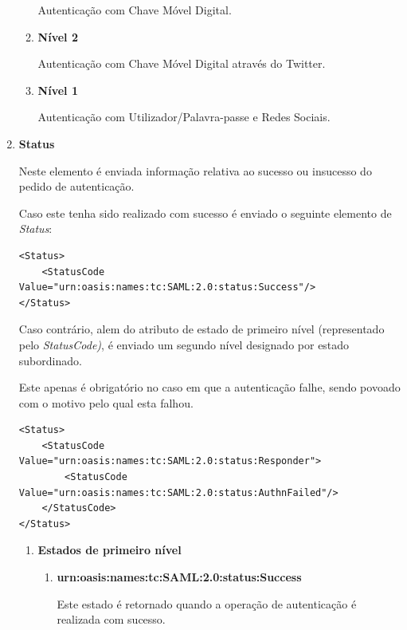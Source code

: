 \begin{enumerate}
\begin{enumerate}
        Autenticação com Chave Móvel Digital.
        
        \item \textbf{Nível 2}
        
        Autenticação com Chave Móvel Digital através do Twitter.
        
        \item \textbf{Nível 1}
        
        Autenticação com Utilizador/Palavra-passe  e Redes Sociais.
    \end{enumerate}
    
    \item \textbf{Status}
    
    Neste elemento é enviada informação relativa ao sucesso ou insucesso do pedido de autenticação. 
    
    Caso este tenha sido realizado com sucesso é enviado o seguinte elemento de \emph{Status}:
    
    \begin{lstlisting}
<Status>
    <StatusCode Value="urn:oasis:names:tc:SAML:2.0:status:Success"/>
</Status>
    \end{lstlisting}
    
    \vspace{-10mm}
    Caso contrário, alem do atributo de estado de primeiro nível (representado pelo \emph{StatusCode)}, é enviado um segundo nível designado por estado subordinado.
    
    Este apenas é obrigatório no caso em que a autenticação falhe, sendo povoado com o motivo pelo qual esta falhou.
    
    \begin{lstlisting}
<Status>
    <StatusCode  Value="urn:oasis:names:tc:SAML:2.0:status:Responder">
        <StatusCode Value="urn:oasis:names:tc:SAML:2.0:status:AuthnFailed"/>
    </StatusCode>
</Status>
    \end{lstlisting}
    
    \vspace{-10mm}
    \begin{enumerate}
        \item \textbf{Estados de primeiro nível}
        \begin{enumerate}
            \item \textbf{urn:oasis:names:tc:SAML:2.0:status:Success}
            
            Este estado é retornado quando a operação de autenticação é realizada com sucesso.
            

\end{enumerate}
\end{enumerate}
\end{enumerate}
